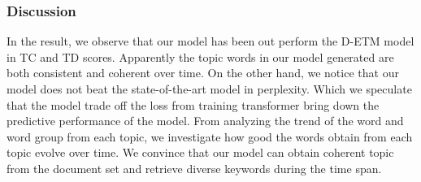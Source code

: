 \subsubsection{Discussion}
In the result, we observe that our model has been out perform the D-ETM model in TC and TD scores. Apparently the topic words in our model generated are both consistent  and coherent over time.
On the other hand, we notice that our model does not beat the state-of-the-art model in perplexity. Which we speculate that the model trade off the loss from training transformer bring down the predictive performance of the model.
From analyzing the trend of the word and word group from each topic, we investigate how good the words obtain from each topic evolve over time. We convince that our model can obtain coherent topic from the document set and retrieve diverse keywords during the time span.